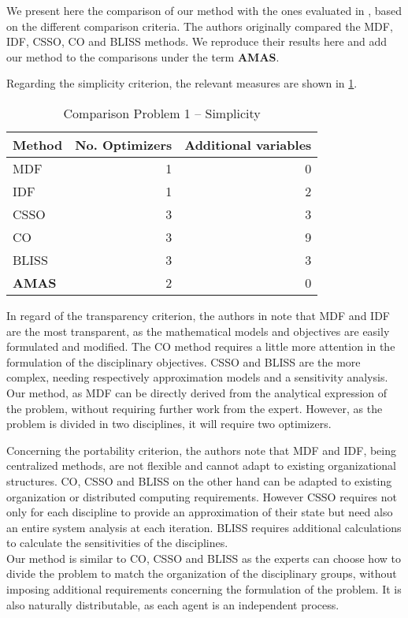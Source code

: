We present here the comparison of our method with the ones evaluated in \cite{perez2004evaluation}, based on the different comparison criteria. The authors originally compared the MDF, IDF, CSSO, CO and BLISS methods. We reproduce their results here and add our method to the comparisons under the term \textbf{AMAS}.

Regarding the simplicity criterion, the relevant measures are shown in \tablename{} \ref{bench1_simplicity}.

\begin{table}
\caption{Comparison Problem 1 -- Simplicity}\label{bench1_simplicity}
\centering
\begin{tabular}{lrr}
\toprule
Method & No. Optimizers & Additional variables\\
\midrule
MDF					&	1	&	0	\\
IDF						&	1	&	2	\\
CSSO					& 3	&	3	\\
CO						&	3	&	9	\\
BLISS					&	3	&	3	\\
\textbf{AMAS}	&	2	&	0	\\
\bottomrule
\end{tabular}
\end{table}

In regard of the transparency criterion, the authors in \cite{perez2004evaluation} note that MDF and IDF are the most transparent, as the mathematical models and objectives are easily formulated and modified. The CO method requires a little more attention in the formulation of the disciplinary objectives. CSSO and BLISS are the more complex, needing respectively approximation models and a sensitivity analysis.\\
Our method, as MDF can be directly derived from the analytical expression of the problem, without requiring further work from the expert. However, as the problem is divided in two disciplines, it will require two optimizers.

Concerning the portability criterion, the authors note that  MDF and IDF, being centralized methods, are not flexible and cannot adapt to existing organizational structures. CO, CSSO and BLISS on the other hand can be adapted to existing organization or distributed computing requirements. However CSSO requires not only for each discipline to provide an approximation of their state but need also an entire system analysis at each iteration. BLISS requires additional calculations to calculate the sensitivities of the disciplines.\\
Our method is similar to CO, CSSO and BLISS as the experts can choose how to divide the problem to match the organization of the disciplinary groups, without imposing additional requirements concerning the formulation of the problem. It is also naturally distributable, as each agent is an independent process.

